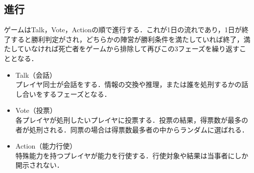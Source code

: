 \documentclass{jarticle}
\begin{document}
\subsection{進行}
ゲームはTalk，Vote，Actionの順で進行する．これが1日の流れであり，1日が終了すると勝利判定がされ，どちらかの陣営が勝利条件を満たしていれば終了，満たしていなければ死亡者をゲームから排除して再びこの3フェーズを繰り返すこととなる．\\
\vspace{-1.5\baselineskip}
\begin{itemize}
\setlength{\leftskip}{-1zw}
  \setlength{\parskip}{0cm}
  \setlength{\itemsep}{0cm}
 \item Talk（会話）\\ 
プレイヤ同士が会話をする．情報の交換や推理，または誰を処刑するかの話し合いをするフェーズとなる．
 \item Vote（投票）\\
各プレイヤが処刑したいプレイヤに投票する．投票の結果，得票数が最多の者が処刑される．同票の場合は得票数最多者の中からランダムに選ばれる．
 \item Action（能力行使）\\
特殊能力を持つプレイヤが能力を行使する．行使対象や結果は当事者にしか開示されない．
\end{itemize}
\end{document}
